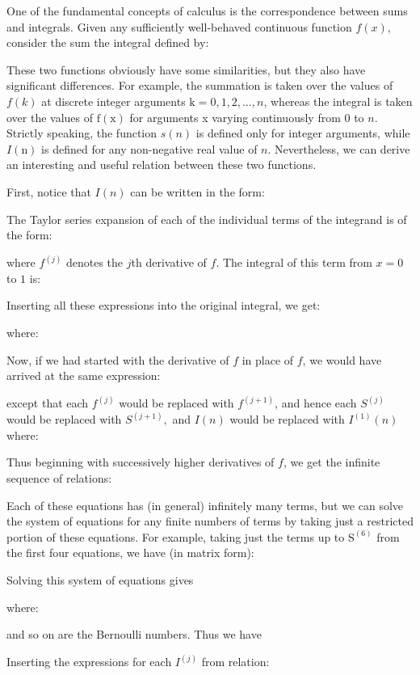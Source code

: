 	\begin{dem}
	One of the fundamental concepts of calculus is the correspondence between sums and integrals. Given any sufficiently well-behaved continuous function $f(x)$, consider the sum the integral defined by:
	
	These two functions obviously have some similarities, but they also have significant differences. For example, the summation is taken over the values of $f(k)$ at discrete integer arguments $\mathrm{k}=0,1,2, \ldots,n$, whereas the integral is taken over the values of $\mathrm{f}(\mathrm{x})$ for arguments x varying continuously from $0$ to $n$. Strictly speaking, the function $s(n)$ is defined only for integer arguments, while $I(\mathrm{n})$ is defined for any non-negative real value of $n$. Nevertheless, we can derive an interesting and useful relation between these two functions.
	
	First, notice that $I(n)$ can be written in the form:
	
	The Taylor series expansion of each of the individual terms of the integrand is of the form:
	
	where $f^{(j)}$ denotes the $j$th derivative of $f$. The integral of this term from $x=0$ to $1$ is:
	
	Inserting all these expressions into the original integral, we get:
	
	where:
	
	Now, if we had started with the derivative of $f$ in place of $f$, we would have arrived at the same expression:
	
	except that each $f^{(j)}$ would be replaced with $f^{(j+1)}$, and hence each $S^{(j)}$ would be replaced with $S^{(j+1)},$ and $I(n)$ would be replaced with $I^{(1)}(n)$ where:
	
	Thus beginning with successively higher derivatives of $f$, we get the infinite sequence of relations:
	
	Each of these equations has (in general) infinitely many terms, but we can solve the system of equations for any finite numbers of terms by taking just a restricted portion of these equations. For example, taking just the terms up to $\mathrm{S}^{(6)}$ from the first four equations, we have (in matrix form):
	
	Solving this system of equations gives
	
	where:
	
	and so on are the Bernoulli numbers. Thus we have
	
	Inserting the expressions for each $I^{(j)}$ from relation:
	

\end{dem}
